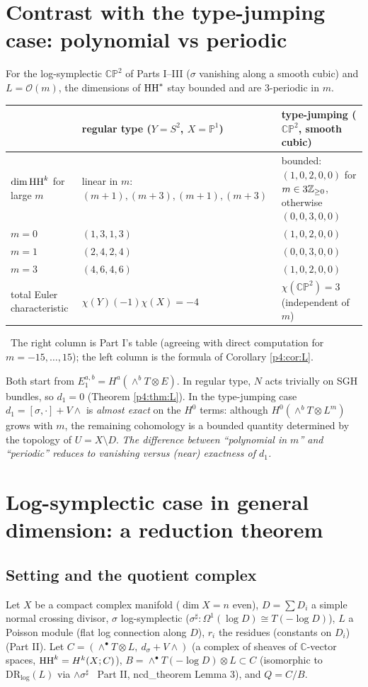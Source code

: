 \section{Contrast with the type-jumping case: polynomial vs periodic}\label{p4:sec:contrast}
For the log-symplectic $\mathbb{CP}^2$ of Parts I--III ($\sigma$ vanishing along a smooth cubic) and $L=\mathcal O(m)$, the dimensions of $\mathrm{HH}^*$ stay bounded and are 3-periodic in $m$.
\begin{center}\small
\begin{tabular}{p{3.6cm}p{4.0cm}p{5.4cm}}\toprule
 & regular type ($Y=S^2$, $X=\mathbb P^1$) & type-jumping ($\mathbb{CP}^2$, smooth cubic)\\\midrule
$\dim\mathrm{HH}^k$ for large $m$ & linear in $m$: $(m+1),(m+3),(m+1),(m+3)$ & bounded: $(1,0,2,0,0)$ for $m\in3\mathbb Z_{\ge0}$, otherwise $(0,0,3,0,0)$\\\midrule
$m=0$ & $(1,3,1,3)$ & $(1,0,2,0,0)$\\\midrule
$m=1$ & $(2,4,2,4)$ & $(0,0,3,0,0)$\\\midrule
$m=3$ & $(4,6,4,6)$ & $(1,0,2,0,0)$\\\midrule
total Euler characteristic & $\chi(Y)(-1)\chi(X)=-4$ & $\chi(\mathbb{CP}^2)=3$ (independent of $m$)\\\bottomrule
\end{tabular}
\end{center}
\tV\ The right column is Part I's table (agreeing with direct computation for $m=-15,\dots,15$); the left column is the formula of Corollary \ref{p4:cor:L}.
\begin{obs}\tP\label{p4:obs:contrast}
Both start from $E_1^{a,b}=H^a(\wedge^bT\otimes E)$. In regular type, $N$ acts trivially on SGH bundles, so $d_1=0$ (Theorem \ref{p4:thm:L}). In the type-jumping case $d_1=[\sigma,\cdot]+V\wedge$ is \emph{almost exact} on the $H^0$ terms: although $H^0(\wedge^bT\otimes L^m)$ grows with $m$, the remaining cohomology is a bounded quantity determined by the topology of $U=X\setminus D$. \emph{The difference between ``polynomial in $m$'' and ``periodic'' reduces to vanishing versus (near) exactness of $d_1$.}
\end{obs}

\section{Log-symplectic case in general dimension: a reduction theorem}\label{p4:sec:log}
\subsection{Setting and the quotient complex}\label{p4:sec:Q}
Let $X$ be a compact complex manifold ($\dim X=n$ even), $D=\sum D_i$ a simple normal crossing divisor, $\sigma$ log-symplectic ($\sigma^\sharp:\Omega^1(\log D)\cong T(-\log D)$), $L$ a Poisson module (flat log connection along $D$), $r_i$ the residues (constants on $D_i$) (Part II). Let $C=(\wedge^\bullet T\otimes L,\ d_\sigma+V\wedge)$ (a complex of sheaves of $\mathbb C$-vector spaces, $\mathrm{HH}^k=H^k(X;C)$), $B=\wedge^\bullet T(-\log D)\otimes L\subset C$ (isomorphic to $\mathrm{DR}_{\log}(L)$ via $\wedge\sigma^\sharp$ \tC\ Part II, ncd\_theorem Lemma 3), and $Q=C/B$.

